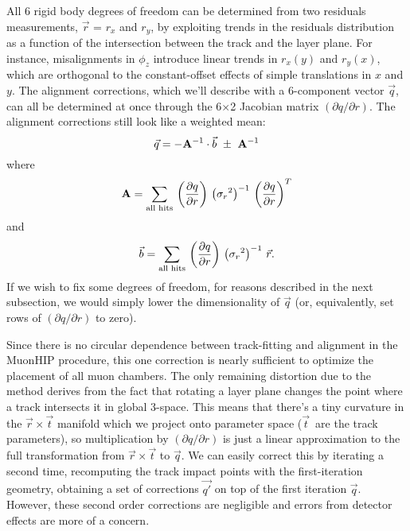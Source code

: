 \documentclass[12pt]{article}
\begin{document}
All 6 rigid body degrees of freedom can be determined from two
residuals measurements, $\vec{r}$ = $r_x$ and $r_y$, by exploiting
trends in the residuals distribution as a function of the intersection
between the track and the layer plane.  For instance, misalignments in
$\phi_z$ introduce linear trends in $r_x(y)$ and $r_y(x)$, which are
orthogonal to the constant-offset effects of simple translations in
$x$ and $y$.  The alignment corrections, which we'll describe with a
6-component vector $\vec{q}$, can all be determined at once through
the 6$\times$2 Jacobian matrix $(\partial q/\partial r)$.  The
alignment corrections still look like a weighted mean:
\begin{equation}
\vec{q} = -{\bf A}^{-1} \cdot \vec{b} \ \pm\  {\bf A}^{-1}
\label{alignment_corrections1}
\end{equation}
where
\begin{equation}
{\bf A} = \sum_{\mbox{\scriptsize all hits}} \,
  \left(\frac{\partial q}{\partial r}\right) \,
  \left({\sigma_r}^2\right)^{-1} \,
  \left(\frac{\partial q}{\partial r}\right)^T
\end{equation}
and
\begin{equation}
\vec{b} = \sum_{\mbox{\scriptsize all hits}} \,
  \left(\frac{\partial q}{\partial r}\right) \,
  \left({\sigma_r}^2\right)^{-1} \,
  \vec{r} \mbox{.}
\label{alignment_corrections2}
\end{equation}
If we wish to fix some degrees of freedom, for reasons described in
the next subsection, we would simply lower the dimensionality of
$\vec{q}$ (or, equivalently, set rows of $(\partial q/\partial r)$ to
zero).

Since there is no circular dependence between track-fitting and
alignment in the MuonHIP procedure, this one correction is nearly
sufficient to optimize the placement of all muon chambers.  The only
remaining distortion due to the method derives from the fact that
rotating a layer plane changes the point where a track intersects it
in global 3-space.  This means that there's a tiny curvature in the
$\vec{r} \times \vec{t}$ manifold which we project onto parameter
space ($\vec{t}$~are the track parameters), so multiplication by
$(\partial q/\partial r)$ is just a linear approximation to the full
transformation from $\vec{r}\times\vec{t}$ to $\vec{q}$.  We can
easily correct this by iterating a second time, recomputing the track
impact points with the first-iteration geometry, obtaining a set of
corrections $\vec{q'}$ on top of the first iteration $\vec{q}$.
However, these second order corrections are negligible and errors from
detector effects are more of a concern.
\end{document}
